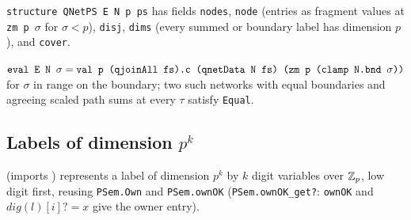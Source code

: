 \begin{definition}
\textnormal{\texttt{structure QNetPS E N p ps}} has fields \textnormal{\texttt{nodes}}, \textnormal{\texttt{node}} (entries as fragment values at
\textnormal{\texttt{zm p \ensuremath{\sigma}}} for $\sigma<p$), \textnormal{\texttt{disj}}, \textnormal{\texttt{dims}} (every summed or boundary label has dimension
$p$), and \textnormal{\texttt{cover}}.
\end{definition}
\begin{theorem}
$\textnormal{\texttt{eval E N \ensuremath{\sigma}}} = \textnormal{\texttt{val p (\allowbreak{}qjoinAll fs).\allowbreak{}c (\allowbreak{}qnetData N fs) (\allowbreak{}zm p (\allowbreak{}clamp N.\allowbreak{}bnd \ensuremath{\sigma}))}}$ for $\sigma$ in
range on the boundary; two such networks with equal boundaries and agreeing scaled path sums at
every $\tau$ satisfy \textnormal{\texttt{Equal}}.
\end{theorem}

\subsection{Labels of dimension \texorpdfstring{$p^k$}{p\^{}k}}

 (imports ) represents a label of dimension $p^k$ by
$k$ digit variables over $\mathbb{Z}_{p}$, low digit first, reusing \textnormal{\texttt{PSem.\allowbreak{}Own}} and \textnormal{\texttt{PSem.\allowbreak{}ownOK}}
(\textnormal{\texttt{PSem.\allowbreak{}ownOK\_\allowbreak{}get?}}: \textnormal{\texttt{ownOK}} and $\mathit{dig}(l)[i]? = x$ give the owner entry).


